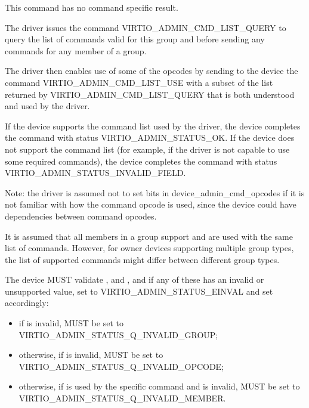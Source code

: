 This command has no command specific result.

The driver issues the command VIRTIO_ADMIN_CMD_LIST_QUERY to
query the list of commands valid for this group and before sending
any commands for any member of a group.

The driver then enables use of some of the opcodes by sending to
the device the command VIRTIO_ADMIN_CMD_LIST_USE with a subset
of the list returned by VIRTIO_ADMIN_CMD_LIST_QUERY that is
both understood and used by the driver.

If the device supports the command list used by the driver, the
device completes the command with status VIRTIO_ADMIN_STATUS_OK.
If the device does not support the command list
(for example, if the driver is not capable to use
some required commands), the device
completes the command with status
VIRTIO_ADMIN_STATUS_INVALID_FIELD.

Note: the driver is assumed not to set bits in
device_admin_cmd_opcodes
if it is not familiar with how the command opcode
is used, since the device could have dependencies between
command opcodes.

It is assumed that all members in a group support and are used
with the same list of commands. However, for owner devices
supporting multiple group types, the list of supported commands
might differ between different group types.







The device MUST validate ,  and
, and if any of these has an invalid or
unsupported value, set  to
VIRTIO_ADMIN_STATUS_EINVAL and set 
accordingly:
\begin{itemize}
\item if  is invalid, 
	MUST be set to VIRTIO_ADMIN_STATUS_Q_INVALID_GROUP;
\item otherwise, if  is invalid,
	 MUST be set to
	VIRTIO_ADMIN_STATUS_Q_INVALID_OPCODE;
\item otherwise, if  is used by the
	specific command and is invalid,  MUST be
	set to VIRTIO_ADMIN_STATUS_Q_INVALID_MEMBER.
\end{itemize}

